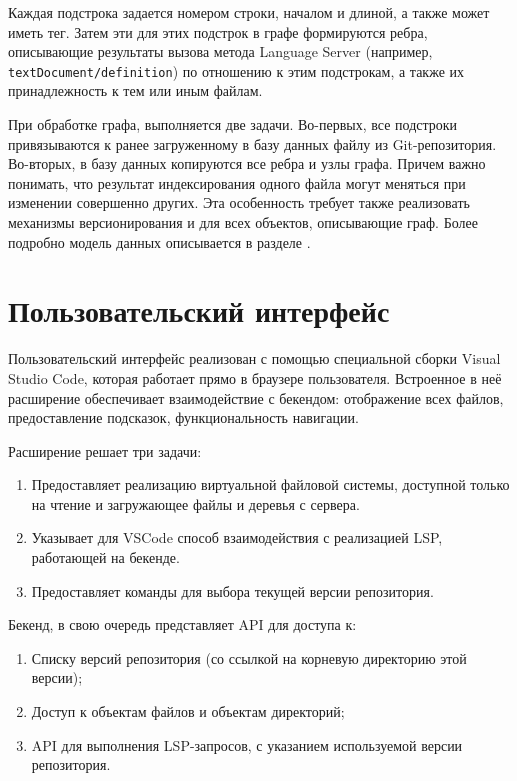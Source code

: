 Каждая подстрока задается номером строки, началом и длиной, а также может иметь тег. Затем эти для этих подстрок в графе формируются ребра, описывающие результаты вызова метода Language Server (например, \texttt{textDocument/definition}) по отношению к этим подстрокам, а также их принадлежность к тем или иным файлам.

При обработке графа, выполняется две задачи. Во-первых, все подстроки привязываются к ранее загруженному в базу данных файлу из Git-репозитория. Во-вторых, в базу данных копируются все ребра и узлы графа. Причем важно понимать, что результат индексирования одного файла могут меняться при изменении совершенно других. Эта особенность требует также реализовать механизмы версионирования и для всех объектов, описывающие граф. Более подробно модель данных описывается в разделе .

\section{Пользовательский интерфейс}

Пользовательский интерфейс реализован с помощью специальной сборки Visual Studio Code, которая работает прямо в браузере пользователя. Встроенное в неё расширение обеспечивает взаимодействие с бекендом: отображение всех файлов, предоставление подсказок, функциональность навигации.

Расширение решает три задачи:
\begin{enumerate}
    \item Предоставляет реализацию виртуальной файловой системы, доступной только на чтение и загружающее файлы и деревья с сервера.
    \item Указывает для VSCode способ взаимодействия с реализацией \gls{LSP}, работающей на бекенде.
    \item Предоставляет команды для выбора текущей версии репозитория.
\end{enumerate}

Бекенд, в свою очередь представляет API для доступа к:

\begin{enumerate}
    \item Списку версий репозитория (со ссылкой на корневую директорию этой версии);
    \item Доступ к объектам файлов и объектам директорий;
    \item API для выполнения LSP-запросов, с указанием используемой версии репозитория.
\end{enumerate}

